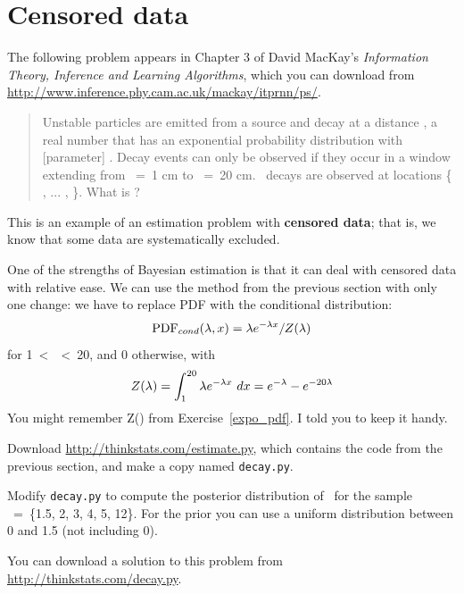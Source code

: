 \documentclass[12pt]{book}
\begin{document}
\section{Censored data}
\label{censored}

The following problem appears in Chapter 3 of David MacKay's
{\em Information Theory, Inference and Learning
  Algorithms}, which you can download from
\url{http://www.inference.phy.cam.ac.uk/mackay/itprnn/ps/}.

\begin{quote}
Unstable particles are emitted from a source and decay at a distance
\x, a real number that has an exponential probability distribution
with [parameter] \mylambda.  Decay events can
only be observed if they occur in a window extending from \x~=~1 cm to
\x~=~20 cm.  \n~decays are observed at locations \{ \x{}, ... , \x{}
\}.  What is \mylambda?

\end{quote}

This is an example of an estimation problem with {\bf censored data};
that is, we know that some data are systematically excluded.

One of the strengths of Bayesian estimation is that it can deal with
censored data with relative ease.  We can use the method from the
previous section with only one change: we have to replace
PDF with the conditional distribution:
%
\[ \mathrm{PDF}_{cond}(\lambda, x) = \lambda e^{-\lambda x} / Z(\lambda)  \]
%
for 1~<~\x~<~20, and 0 otherwise, with
%
\[ Z(\lambda) = \int_1^{20} \lambda e^{-\lambda x} ~ dx = 
e^{-\lambda} - e^{-20 \lambda}  \]
%
You might remember Z(\mylambda) from Exercise~\ref{expo_pdf}.  I told
you to keep it handy.

\begin{exercise}
Download \url{http://thinkstats.com/estimate.py}, which contains the code
from the previous section, and make a copy named {\tt decay.py}.

Modify {\tt decay.py} to compute the posterior distribution of
\mylambda~for the sample \X~=~\{1.5, 2, 3, 4, 5, 12\}.  For
the prior you can use a uniform distribution between 0
and 1.5 (not including 0).

You can download a solution to this problem from
\url{http://thinkstats.com/decay.py}.

\end{exercise}
\end{document}
